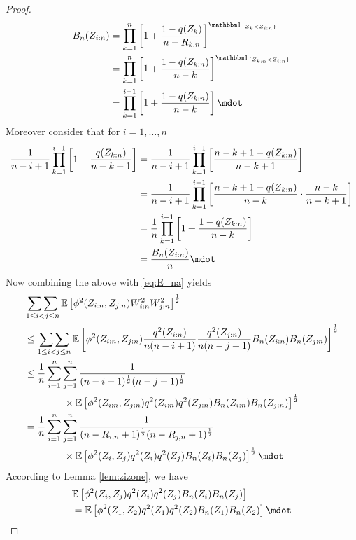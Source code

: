 \begin{lemma}
\begin{proof}
		\begin{align*}
			B_n(Z_{i:n}) &= \prod_{k=1}^{n}\left[1+\frac{1-q(Z_{k})}{n-R_{k,n}}\right]^{\I{Z_{k} < Z_{i:n}}}\\
			&= \prod_{k=1}^{n}\left[1+\frac{1-q(Z_{k:n})}{n-k}\right]^{\I{Z_{k:n} < Z_{i:n}}}\\
			&=  \prod_{k=1}^{i-1}\left[1+\frac{1-q(Z_{k:n})}{n-k}\right]\mdot
		\end{align*}
		Moreover consider that for $i=1,\dots,n$
		\begin{align*}
			\frac{1}{n-i+1}\prod_{k=1}^{i-1}\left[1-\frac{q(Z_{k:n})}{n-k+1}\right]
			&=  \frac{1}{n-i+1}\prod_{k=1}^{i-1}\left[\frac{n-k+1-q(Z_{k:n})}{n-k+1}\right] \\
			&=  \frac{1}{n-i+1}\prod_{k=1}^{i-1}\left[\frac{n-k+1-q(Z_{k:n})}{n-k} \cdot \frac{n-k}{n-k+1}\right]\\
			&=  \frac{1}{n}\prod_{k=1}^{i-1}\left[1+\frac{1-q(Z_{k:n})}{n-k}\right]\\
			&=  \frac{B_n(Z_{i:n})}{n}\mdot
		\end{align*}
		Now combining the above with \eqref{eq:E_na} yields 
		\begin{align*}
			&\doublesum\limits_{1\leq i<j\leq n}\E\left[\phi^2(Z_{i:n}, Z_{j:n}) W^2_{i:n} W^2_{j:n}\right]^{\frac{1}{2}}\\
			&\leq \doublesum\limits_{1\leq i<j\leq n}\E\left[\phi^2(Z_{i:n}, Z_{j:n}) \frac{q^2(Z_{i:n})}{n(n-i+1)}\frac{q^2(Z_{j:n})}{n(n-j+1)} B_n(Z_{i:n})B_n(Z_{j:n})\right]^\frac{1}{2}\\
			&\leq \frac{1}{n}\sum_{i=1}^{n}\sum_{j=1}^{n}\frac{1}{(n-i+1)^\frac{1}{2}(n-j+1)^\frac{1}{2}}\\
			&\qquad\qquad\times \E\left[\phi^2(Z_{i:n}, Z_{j:n}) q^2(Z_{i:n})q^2(Z_{j:n}) B_n(Z_{i:n})B_n(Z_{j:n})\right]^\frac{1}{2}\\
			&= \frac{1}{n}\sum_{i=1}^{n}\sum_{j=1}^{n} \frac{1}{(n-R_{i,n}+1)^{\frac{1}{2}} (n-R_{j,n}+1)^{\frac{1}{2}}}\\
			&\qquad\qquad \times \E\left[\phi^2(Z_{i}, Z_{j}) q^2(Z_{i})q^2(Z_{j})B_n(Z_{i})B_n(Z_{j})\right]^{\frac{1}{2}} \mdot
		\end{align*}
		According to Lemma \ref{lem:zizone}, we have
		\begin{align*}
			&\E\left[\phi^2(Z_{i}, Z_{j}) q^2(Z_{i})q^2(Z_{j})B_n(Z_{i})B_n(Z_{j})\right]\\
			&= \E\left[\phi^2(Z_{1}, Z_{2}) q^2(Z_{1})q^2(Z_{2})B_n(Z_{1})B_n(Z_{2})\right]\mdot
		\end{align*}

\end{proof}
\end{lemma}
